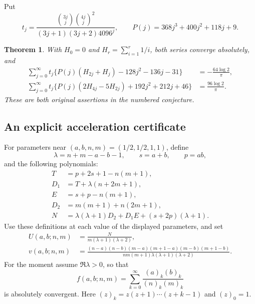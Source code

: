 \documentclass[11pt,a4paper]{article}
\newtheorem{theorem}{Theorem}[section]
\theoremstyle{remark}\newtheorem{remark}[theorem]{Remark}
\numberwithin{equation}{section}
\begin{document}
Put
\[
 t_j=\frac{\binom{3j}{j}\binom{4j}{j}^{\!2}}
 {(3j+1)(3j+2)4096^j},\qquad
 P(j)=368j^3+400j^2+118j+9.
\]
\begin{theorem}\label{thm:sun427-complete}
With $H_0=0$ and $H_r=\sum_{i=1}^{r}1/i$, both series converge
absolutely, and
\begin{align}
 \sum_{j=0}^{\infty}t_j\bigl\{P(j)(H_{2j}+H_j)
       -128j^2-136j-31\bigr\}
 &=-\frac{64\log2}{\pi},\label{eq:s427-target1}\\
 \sum_{j=0}^{\infty}t_j\bigl\{P(j)(2H_{4j}-5H_{2j})
       +192j^2+212j+46\bigr\}
 &=\frac{96\log2}{\pi}.\label{eq:s427-target2}
\end{align}
These are both original assertions in the numbered conjecture.
\end{theorem}

\subsection{An explicit acceleration certificate}

For parameters near $(a,b,n,m)=(1/2,1/2,1,1)$, define
\[
 \lambda=n+m-a-b-1,\qquad s=a+b,\qquad p=ab,
\]
and the following polynomials:
\begin{align*}
 T&=p+2s+1-n(m+1),\\
 D_1&=T+\lambda(n+2m+1),\\
 E&=s+p-n(m+1),\\
 D_2&=m(m+1)+n(2m+1),\\
 N&=\lambda(\lambda+1)D_2+D_1E+(s+2p)(\lambda+1).
\end{align*}
Use these definitions at each value of the displayed parameters, and set
\begin{align}
 U(a,b;n,m)&=\frac{N}{m(\lambda+1)(\lambda+2)},\label{eq:s427-U}\\
 v(a,b;n,m)&=
 \frac{(n-a)(n-b)(m-a)(m+1-a)(m-b)(m+1-b)}
 {nm(m+1)\lambda(\lambda+1)(\lambda+2)}.\label{eq:s427-v}
\end{align}
For the moment assume $\Re\lambda>0$, so that
\[
 f(a,b;n,m)=\sum_{k=0}^{\infty}
       \frac{(a)_k(b)_k}{(n)_k(m)_k}
\]
is absolutely convergent. Here $(z)_k=z(z+1)\cdots(z+k-1)$ and
$(z)_0=1$.
\end{document}
